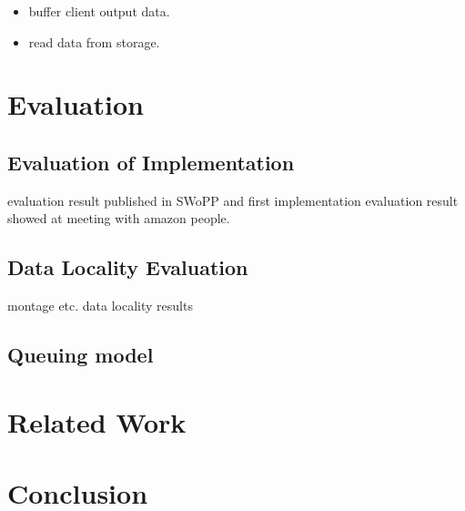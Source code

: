 \documentclass{article}
\begin{document}
\begin{itemize}
	\item buffer client output data.
	\item read data from storage.
\end{itemize}

\section{Evaluation}
\subsection{Evaluation of Implementation}
evaluation result published in SWoPP and first implementation evaluation result showed at meeting with amazon people.
\subsection{Data Locality Evaluation}
montage etc. data locality results
\subsection{Queuing model}
		
\section{Related Work}

\section{Conclusion}
\end{document}
